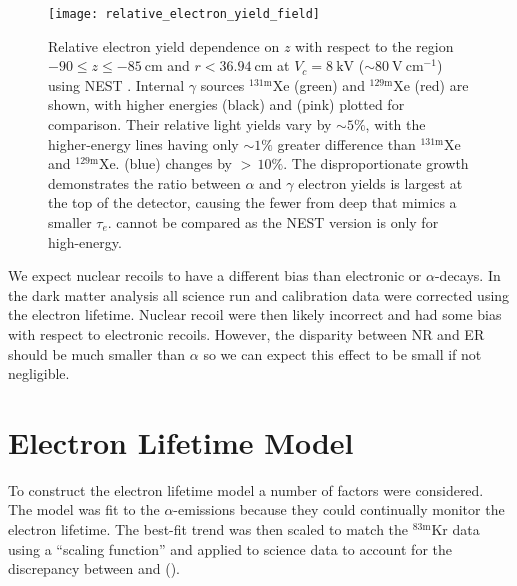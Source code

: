 \begin{figure}
\centering
\texttt{[image: relative\_electron\_yield\_field]}
\caption[Relative electron yield dependence on $z$ with respect to the region $-90 \leq z \leq -85\ \mathrm{cm}$ and
$r < 36.94\ \mathrm{cm}$ at $V_c = 8\ \mathrm{kV}$ (${\sim}80\ \mathrm{V\ cm^{-1}}$) using NEST .  In addition to
, internal $\gamma$ sources $\mathrm{^{131m}Xe}$ and $\mathrm{^{129m}Xe}$
are shown, with higher energies  and  plotted for comparison.]{Relative electron yield dependence on $z$ with
respect to the region $-90 \leq z \leq -85\ \mathrm{cm}$ and
$r < 36.94\ \mathrm{cm}$ at $V_c = 8\ \mathrm{kV}$ (${\sim}80\ \mathrm{V\ cm^{-1}}$) using NEST .  Internal
$\gamma$ sources $\mathrm{^{131m}Xe}$ (green) and $\mathrm{^{129m}Xe}$
(red) are shown, with higher energies  (black) and  (pink) plotted for comparison. Their relative
light yields vary by ${\sim} 5\%$, with the higher-energy lines having only ${\sim} 1\%$ greater difference than $\mathrm{^{131m}Xe}$ and
$\mathrm{^{129m}Xe}$.   (blue) changes by ${>}\, 10\%$.  The disproportionate growth demonstrates the ratio between
$\alpha$ and $\gamma$ electron yields is largest at the top of the detector, causing the fewer \electron from deep \alphadecays that
mimics a smaller $\tau_e$.  \metakr cannot be compared as the NEST version is only for high-energy.}
\label{fig:electron_lifetimes_rn222_vs_kr83m_field_z}
\end{figure}

We expect nuclear recoils to have a different bias than electronic or $\alpha$-decays.  In the dark matter analysis all
science run and calibration data were corrected using the \metakr electron lifetime.  Nuclear recoil \cstwob were then likely incorrect and
had some bias with respect to electronic recoils.  However, the disparity between NR and ER should be much smaller than $\alpha$ so we can
expect this effect to be small if not negligible.



\section{Electron Lifetime Model}
\label{sec:electron_lifetime_model}
To construct the electron lifetime model a number of factors were considered.  The model was fit to the  $\alpha$-emissions
because they could continually monitor the electron lifetime.  The best-fit trend was then scaled to match the $\mathrm{^{83m}Kr}$ data
using a ``scaling function'' and applied to science data to account for the discrepancy between \alphadecays and \metakr
().

